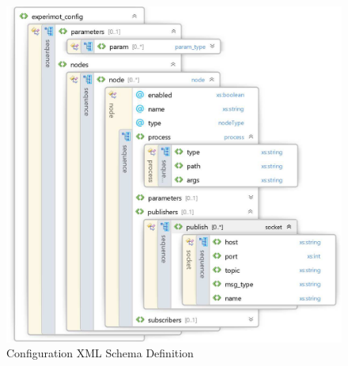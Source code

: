 \begin{figure}
\centering
\includegraphics[width=\textwidth]{assets/xsd_config.eps}
\caption[Configuration XML Schema Definition]{Configuration XML Schema Definition}
\label{fig:config_xsd}
\end{figure}
